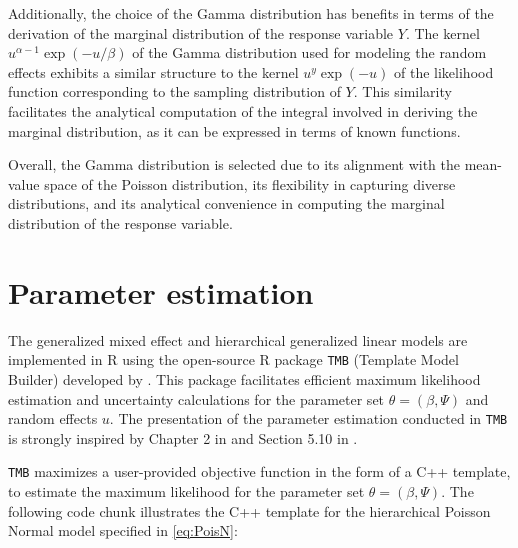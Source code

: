 \documentclass[preprint, 3p, authoryear]{elsarticle} %
\begin{document}
Additionally, the choice of the Gamma distribution has benefits in terms of the derivation of the marginal distribution of the response variable \(Y\). The kernel \(u^{\alpha-1}\exp(-u/\beta)\) of the Gamma distribution used for modeling the random effects exhibits a similar structure to the kernel \(u^y\exp(-u)\) of the likelihood function corresponding to the sampling distribution of \(Y\). This similarity facilitates the analytical computation of the integral involved in deriving the marginal distribution, as it can be expressed in terms of known functions.

Overall, the Gamma distribution is selected due to its alignment with the mean-value space of the Poisson distribution, its flexibility in capturing diverse distributions, and its analytical convenience in computing the marginal distribution of the response variable.

\hypertarget{parameter-estimation}{%
\section{Parameter estimation}\label{parameter-estimation}}

The generalized mixed effect and hierarchical generalized linear models are implemented in R using the open-source R package \texttt{TMB} (Template Model Builder) developed by \citet{Kristensen_2016}. This package facilitates efficient maximum likelihood estimation and uncertainty calculations for the parameter set \(\theta=(\beta, \Psi)\) and random effects \(u\). The presentation of the parameter estimation conducted in \texttt{TMB} is strongly inspired by Chapter 2 in \citet{Kristensen_2016} and Section 5.10 in \citet{Madsen_2010}.

\texttt{TMB} maximizes a user-provided objective function in the form of a C++ template, to estimate the maximum likelihood for the parameter set \(\theta=(\beta, \Psi)\). The following code chunk illustrates the C++ template for the hierarchical Poisson Normal model specified in \ref{eq:PoisN}:
\end{document}
